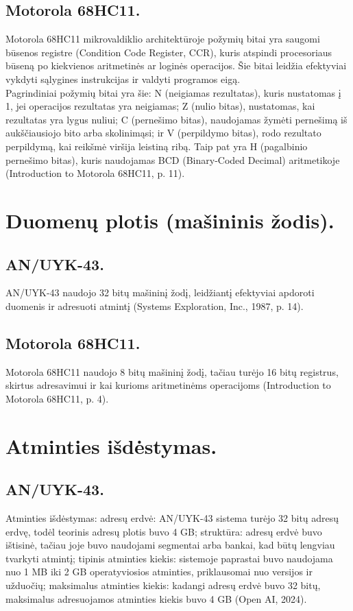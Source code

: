 \documentclass[a4paper,12pt]{article}
\begin{document}
\subsection{Motorola 68HC11.}
Motorola 68HC11 mikrovaldiklio architektūroje požymių bitai yra saugomi būsenos registre (Condition Code Register, CCR), kuris atspindi procesoriaus būseną po kiekvienos aritmetinės ar loginės operacijos. Šie bitai leidžia efektyviai vykdyti sąlygines instrukcijas ir valdyti programos eigą.\\
Pagrindiniai požymių bitai yra šie: N (neigiamas rezultatas), kuris nustatomas į 1, jei operacijos rezultatas yra neigiamas; Z (nulio bitas), nustatomas, kai rezultatas yra lygus nuliui; C (pernešimo bitas), naudojamas žymėti pernešimą iš aukščiausiojo bito arba skolinimąsi; ir V (perpildymo bitas), rodo rezultato perpildymą, kai reikšmė viršija leistiną ribą. Taip pat yra H (pagalbinio pernešimo bitas), kuris naudojamas BCD (Binary-Coded Decimal) aritmetikoje (Introduction to Motorola 68HC11, p. 11).

\section{Duomenų plotis (mašininis žodis).}
\subsection{AN/UYK-43.}
AN/UYK-43 naudojo 32 bitų mašininį žodį, leidžiantį efektyviai apdoroti duomenis ir adresuoti atmintį (Systems Exploration, Inc., 1987, p. 14).
\subsection{Motorola 68HC11.}
Motorola 68HC11 naudojo 8 bitų mašininį žodį, tačiau turėjo 16 bitų registrus, skirtus adresavimui ir kai kurioms aritmetinėms operacijoms (Introduction to Motorola 68HC11, p. 4).

\section{Atminties išdėstymas.}
\subsection{AN/UYK-43.}
Atminties išdėstymas: adresų erdvė: AN/UYK-43 sistema turėjo 32 bitų adresų erdvę, todėl teorinis adresų plotis buvo 4 GB; struktūra: adresų erdvė buvo ištisinė, tačiau joje buvo naudojami segmentai arba bankai, kad būtų lengviau tvarkyti atmintį; tipinis atminties kiekis: sistemoje paprastai buvo naudojama nuo 1 MB iki 2 GB operatyviosios atminties, priklausomai nuo versijos ir užduočių; maksimalus atminties kiekis: kadangi adresų erdvė buvo 32 bitų, maksimalus adresuojamos atminties kiekis buvo 4 GB (Open AI, 2024).
\end{document}
